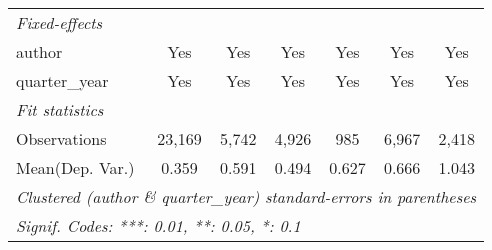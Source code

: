 \begin{tabular}{lcccccc}
   \midrule
   \emph{Fixed-effects}\\
   author                                & Yes           & Yes          & Yes          & Yes           & Yes           & Yes\\  
   quarter\_year                         & Yes           & Yes          & Yes          & Yes           & Yes           & Yes\\  
   \midrule
   \emph{Fit statistics}\\
   Observations                          & 23,169        & 5,742        & 4,926        & 985           & 6,967         & 2,418\\  
Mean(Dep. Var.) & 0.359 & 0.591 & 0.494 & 0.627 & 0.666 & 1.043 \\
   \midrule \midrule
   \multicolumn{7}{l}{\emph{Clustered (author \& quarter\_year) standard-errors in parentheses}}\\
   \multicolumn{7}{l}{\emph{Signif. Codes: ***: 0.01, **: 0.05, *: 0.1}}\\
\end{tabular}
\par\endgroup
